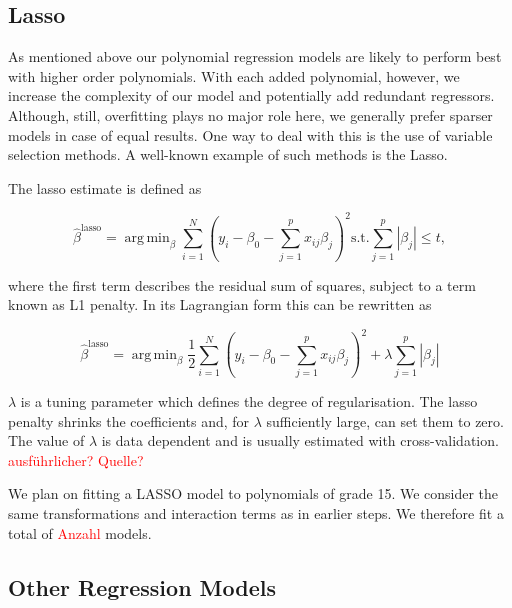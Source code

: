 \documentclass[12pt,a4paper]{article}
\DeclareMathOperator*{\argmin}{arg\,min}
\begin{document}
\hypertarget{section}{%
\subsection{\texorpdfstring{\ac{Lasso}}{}}\label{section}}

As mentioned above our polynomial regression models are likely to
perform best with higher order polynomials. With each added polynomial,
however, we increase the complexity of our model and potentially add
redundant regressors. Although, still, overfitting plays no major role
here, we generally prefer sparser models in case of equal results. One
way to deal with this is the use of variable selection methods. A
well-known example of such methods is the \ac{Lasso}.

The lasso estimate is defined as

\begin{equation}
    \hat{\beta}^{\text{lasso}} = \argmin_{\beta} \sum^N_{i=1} \left( y_i - \beta_0 - \sum^p_{j=1} x_{ij} \beta_j \right)^2
    \text{s.t.} \sum^p_{j=1} |\beta_j | \leq t, 
\label{eq:8}
\end{equation}

where the first term describes the residual sum of squares, subject to a
term known as L1 penalty. In its Lagrangian form this can be rewritten
as

\begin{equation}
    \hat{\beta}^{\text{lasso}} = \argmin_{\beta} \frac{1}{2} \sum^N_{i=1} \left( y_i - \beta_0 - \sum^p_{j=1} x_{ij} \beta_j \right)^2 + 
    \lambda \sum^p_{j=1} |\beta_j |
\label{eq:9}
\end{equation}

\(\lambda\) is a tuning parameter which defines the degree of
regularisation. The lasso penalty shrinks the coefficients and, for
\(\lambda\) sufficiently large, can set them to zero. The value of
\(\lambda\) is data dependent and is usually estimated with
cross-validation. \textcolor{red}{ausführlicher? Quelle?}

We plan on fitting a LASSO model to polynomials of grade 15. We consider
the same transformations and interaction terms as in earlier steps. We
therefore fit a total of \textcolor{red}{Anzahl} models.

\hypertarget{other-regression-models}{%
\subsection{Other Regression Models}\label{other-regression-models}}
\end{document}
